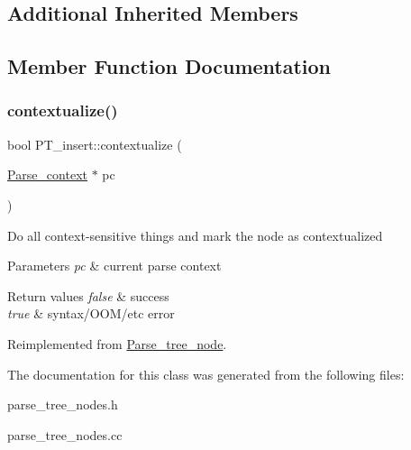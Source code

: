 \subsection*{Additional Inherited Members}


\subsection{Member Function Documentation}
\mbox{\label{classPT__insert_abac83e416618613080e64190c331ccc9}} 
\subsubsection{\texorpdfstring{contextualize()}{contextualize()}}
{\footnotesize\ttfamily bool P\+T\+\_\+insert\+::contextualize (\begin{DoxyParamCaption}\item[{\mbox{\hyperlink{structParse__context}{Parse\+\_\+context}} $\ast$}]{pc }\end{DoxyParamCaption})\hspace{0.3cm}{\ttfamily [virtual]}}

Do all context-\/sensitive things and mark the node as contextualized


\begin{DoxyParams}{Parameters}
{\em pc} & current parse context\\
\hline
\end{DoxyParams}

\begin{DoxyRetVals}{Return values}
{\em false} & success \\
\hline
{\em true} & syntax/\+O\+O\+M/etc error \\
\hline
\end{DoxyRetVals}


Reimplemented from \mbox{\hyperlink{classParse__tree__node_a22d93524a537d0df652d7efa144f23da}{Parse\+\_\+tree\+\_\+node}}.



The documentation for this class was generated from the following files\+:\begin{DoxyCompactItemize}
\item 
parse\+\_\+tree\+\_\+nodes.\+h\item 
parse\+\_\+tree\+\_\+nodes.\+cc\end{DoxyCompactItemize}
